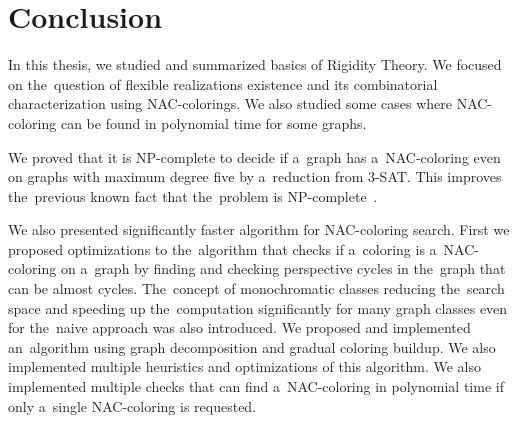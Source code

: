 
\chapter*{Conclusion}



In this thesis,
we studied and summarized basics of Rigidity Theory.
We focused on the~question of flexible realizations existence
and its combinatorial characterization using NAC-colorings.
We also studied some cases where NAC-coloring can be found in polynomial time
for some graphs.

We proved that it is NP-complete
to decide if a~graph has a~NAC-coloring even on graphs with maximum degree five
by a~reduction from 3-SAT\@.
This improves the~previous known fact that the~problem is NP-complete~\cite{np_complete}.

We also presented significantly faster algorithm
for NAC-coloring search.
%
First we proposed optimizations to the~algorithm
that checks if a~coloring is a~NAC-coloring on a~graph
by finding and checking perspective cycles in the~graph
that can be almost cycles.
%
The~concept of monochromatic classes reducing the~search space
and speeding up the~computation significantly for many graph classes
even for the~naive approach was also introduced.
%
We proposed and implemented an~algorithm using graph decomposition and gradual coloring buildup.
We also implemented multiple heuristics and optimizations of this algorithm.
%
We also implemented multiple checks that can find a~NAC-coloring in polynomial time
if only a~single NAC-coloring is requested.

